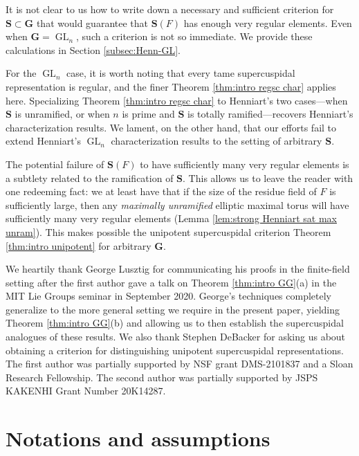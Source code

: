 \documentclass{amsart}
\newcommand{\bfG}{\mathbf{G}}
\newcommand{\bfS}{\mathbf{S}}
\DeclareMathOperator{\GL}{GL}
\theoremstyle{plain}
\theoremstyle{definition}
\theoremstyle{remark}
\theoremstyle{theorem}
\begin{document}
It is not clear to us how to write down a necessary and sufficient criterion for $\bfS \subset \bfG$ that would guarantee that $\bfS(F)$ has enough very regular elements. Even when $\bfG = \GL_n$, such a criterion is not so immediate. We provide these calculations in Section \ref{subsec:Henn-GL}. 

For the $\GL_n$ case, it is worth noting that every tame supercuspidal representation is regular, and the finer Theorem \ref{thm:intro regsc char} applies here. Specializing Theorem \ref{thm:intro regsc char} to Henniart's two cases---when $\bfS$ is unramified, or when $n$ is prime and $\bfS$ is totally ramified---recovers Henniart's characterization results. We lament, on the other hand, that our efforts fail to extend Henniart's $\GL_n$ characterization results to the setting of arbitrary $\bfS$.

The potential failure of $\bfS(F)$ to have sufficiently many very regular elements is a subtlety related to the ramification of $\bfS$. This allows us to leave the reader with one redeeming fact: we at least have that if the size of the residue field of $F$ is sufficiently large, then any \textit{maximally unramified} elliptic maximal torus will have sufficiently many very regular elements (Lemma \ref{lem:strong Henniart sat max unram}). This makes possible the unipotent supercuspidal criterion Theorem \ref{thm:intro unipotent} for arbitrary $\bfG$.


\medbreak
{}\quad
We heartily thank George Lusztig for communicating his proofs in the finite-field setting \cite{Lus20} after the first author gave a talk on Theorem \ref{thm:intro GG}(a) in the MIT Lie Groups seminar in September 2020. George's techniques completely generalize to the more general setting we require in the present paper,  yielding Theorem \ref{thm:intro GG}(b) and allowing us to then establish the supercuspidal analogues of these results.
We also thank Stephen DeBacker for asking us about obtaining a criterion for distinguishing unipotent supercuspidal representations. 
The first author was partially supported by NSF grant DMS-2101837 and a Sloan Research Fellowship. 
The second author was partially supported by JSPS KAKENHI Grant Number 20K14287.

\newpage

\tableofcontents


\newpage



\section{Notations and assumptions}\label{sec:notations}
\end{document}
